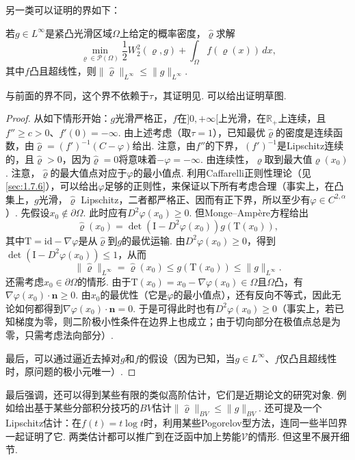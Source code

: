 另一类可以证明的界如下：
\begin{proposition}\label{obj:7.32}
若$g\in L^\infty$是紧凸光滑区域$\Omega$上给定的概率密度，$\widehat\varrho$求解
\[
 \min_{\varrho\in\mathscr P(\Omega)}\frac12W_2^2(\varrho,g)
                         +\int_\Omega f(\varrho(x))\,dx,
\]
其中$f$凸且超线性，则$\|\widehat\varrho\|_{L^\infty}\leq\|g\|_{L^\infty}$.
\end{proposition}
与前面的界不同，这个界不依赖于$\tau$，其证明见\cite{b110,b270}. 可以给出证明草图.
\begin{proof}
从如下情形开始：$g$光滑严格正，$f$在$]0,+\infty[$上光滑，在$\mathbb R_+$上连续，且$f''\geq c>0$、$f'(0)=-\infty$. 由上述考虑（取$\tau=1$），已知最优$\widehat\varrho$的密度是连续函数，由$\widehat\varrho=(f')^{-1}(C-\varphi)$给出. 注意，由$f''$的下界，$(f')^{-1}$是Lipschitz连续的，且$\widehat\varrho>0$，因为$\widehat\varrho=0$将意味着$-\varphi=-\infty$. 由连续性，$\widehat\varrho$取到最大值$\widehat\varrho(x_0)$. 注意，$\widehat\varrho$的最大值点对应于$\varphi$的最小值点. 利用Caffarelli正则性理论（见\autoref{sec:1.7.6}），可以给出$\varphi$足够的正则性，来保证以下所有考虑合理（事实上，在凸集上，$g$光滑，$\widehat\varrho$ Lipschitz，二者都严格正、因而有正下界，所以至少有$\varphi\in C^{2,\alpha}$）. 先假设$x_0\notin\partial\Omega$. 此时应有$D^2\varphi(x_0)\geq0$. 但Monge--Ampère方程给出
\[
 \widehat\varrho(x_0)=\det(\mathrm I-D^2\varphi(x_0))g(\mathrm T(x_0)),
\]
其中$\mathrm T=\mathrm{id}-\nabla\varphi$是从$\widehat\varrho$到$g$的最优运输. 由$D^2\varphi(x_0)\geq0$，得到$\det(\mathrm I-D^2\varphi(x_0))\leq1$，从而
\[
 \|\widehat\varrho\|_{L^\infty}=\widehat\varrho(x_0)
                   \leq g(\mathrm T(x_0))\leq\|g\|_{L^\infty}.
\]
还需考虑$x_0\in\partial\Omega$的情形. 由于$\mathrm T(x_0)=x_0-\nabla\varphi(x_0)\in\Omega$且$\Omega$凸，有$\nabla\varphi(x_0)\cdot\mathbf n\geq0$. 由$x_0$的最优性（它是$\varphi$的最小值点），还有反向不等式，因此无论如何都得到$\nabla\varphi(x_0)\cdot\mathbf n=0$. 于是可得此时也有$D^2\varphi(x_0)\geq0$（事实上，若已知梯度为零，则二阶极小性条件在边界上也成立；由于切向部分在极值点总是为零，只需考虑法向部分）.

最后，可以通过逼近去掉对$g$和$f$的假设（因为已知，当$g\in L^\infty$、$f$仅凸且超线性时，原问题的极小元唯一）.
\end{proof}
最后强调，还可以得到某些有限的类似高阶估计，它们是近期论文的研究对象. \label{idx:i22-p279}
例如\cite{b151}给出基于某些分部积分技巧的$BV$估计$\|\widehat\varrho\|_{BV}\leq\|g\|_{BV}$. 还可提及一个Lipschitz估计：在$f(t)=t\log t$时，\cite{b207}利用某些Pogorelov型方法，连同一些半凹界一起证明了它. 两类估计都可以推广到在泛函中加上势能$\mathscr V$的情形. 但这里不展开细节.

